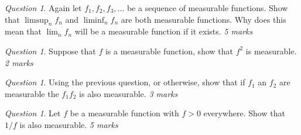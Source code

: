 \documentclass[11pt]{article}
\theoremstyle{definition}
\theoremstyle{remark}
\newtheorem{q}[thm]{Question}
\begin{document}
\begin{q}
Again let $f_1, f_2, f_3, \dots$ be a sequence of measurable functions. Show that $\limsup_n f_n$ and $\liminf_n f_n$ are both measurable functions. Why does this mean that $\lim_n f_n$ will be a measurable function if it exists. \emph{5 marks}
\end{q}

\begin{q}
Suppose that $f$ is a measurable function, show that $f^2$ is measurable. \emph{2 marks}
\end{q}

\begin{q}
Using the previous question, or otherwise, show that if $f_1$ an $f_2$ are measurable the $f_1 f_2$ is also measurable.  \emph{3 marks}
\end{q}

\begin{q}
Let $f$ be a measurable function with $f >0$ everywhere. Show that $1/f$ is also measurable. \emph{5 marks}
\end{q}

\end{document}
